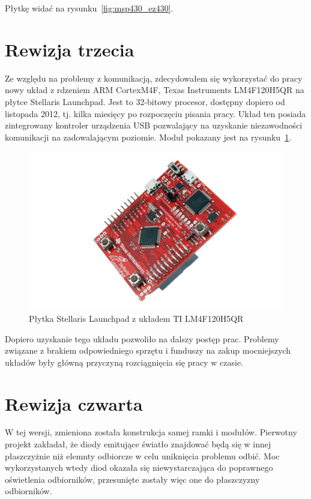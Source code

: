 Płytkę widać na rysunku~\ref{fig:msp430_ez430}.\\

\section{Rewizja trzecia}

Ze względu na problemy z komunikacją, zdecydowałem się wykorzystać do pracy nowy układ z rdzeniem ARM Cortex\ppauza{}M4F, Texas Instruments LM4F120H5QR na płytce Stellaris Launchpad. Jest to 32-bitowy procesor, dostępny dopiero od listopada 2012, tj. kilka miesięcy po rozpoczęciu pisania pracy.
Układ ten posiada zintegrowany kontroler urządzenia USB pozwalający na uzyskanie niezawodności komunikacji na zadowalającym poziomie.
Moduł pokazany jest na rysunku~\ref{fig:stellaris_launchpad}.

\begin{figure}
 \centering
 \includegraphics[width=\textwidth]{gfx/stellaris_launchpad}
 \caption[Płytka Stellaris Launchpad]{Płytka Stellaris Launchpad z układem TI LM4F120H5QR}
 \label{fig:stellaris_launchpad}
\end{figure}

Dopiero uzyskanie tego układu pozwoliło na dalszy postęp prac. Problemy związane z brakiem odpowiedniego sprzętu i funduszy na zakup mocniejszych układów były główną przyczyną rozciągnięcia się pracy w czasie.\\

\section{Rewizja czwarta}

W tej wersji, zmieniona została konstrukcja samej ramki i modułów. Pierwotny projekt zakładał, że diody emitujące światło znajdować będą się w innej płaszczyżnie niż elemnty odbiorcze w celu uniknięcia problemu odbić. Moc wykorzystanych wtedy diod okazała się niewystarczająca do poprawnego oświetlenia odbiorników, przesunięte zostały więc one do płaszczyzny odbiorników.


